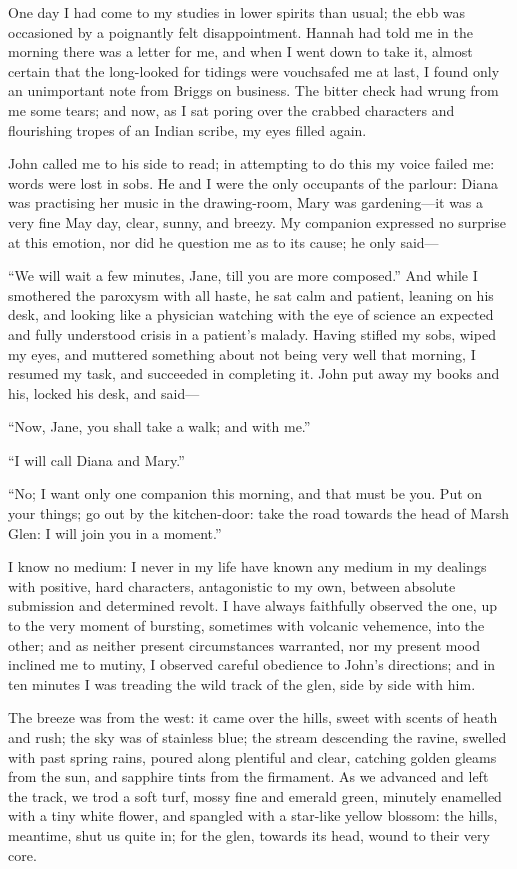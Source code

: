 One day I had come to my studies in lower spirits than usual; the ebb
was occasioned by a poignantly felt disappointment. Hannah had told me
in the morning there was a letter for me, and when I went down to take
it, almost certain that the long-looked for tidings were vouchsafed me
at last, I found only an unimportant note from \Mr{} Briggs on business. 
The bitter check had wrung from me some tears; and now, as I sat poring
over the crabbed characters and flourishing tropes of an Indian scribe,
my eyes filled again.

\St{} John called me to his side to read; in attempting to do this my
voice failed me: words were lost in sobs. He and I were the only
occupants of the parlour: Diana was practising her music in the
drawing-room, Mary was gardening---it was a very fine May day, clear,
sunny, and breezy. My companion expressed no surprise at this emotion,
nor did he question me as to its cause; he only said---

\enquote{We will wait a few minutes, Jane, till you are more composed.} 
And while I smothered the paroxysm with all haste, he sat calm and
patient, leaning on his desk, and looking like a physician watching with
the eye of science an expected and fully understood crisis in a
patient's malady. Having stifled my sobs, wiped my eyes, and muttered
something about not being very well that morning, I resumed my task, and
succeeded in completing it. \St{} John put away my books and his, locked
his desk, and said---

\enquote{Now, Jane, you shall take a walk; and with me.}

\enquote{I will call Diana and Mary.}

\enquote{No; I want only one companion this morning, and that must be
you. Put on your things; go out by the kitchen-door: take the road
towards the head of Marsh Glen: I will join you in a moment.}

I know no medium: I never in my life have known any medium in my
dealings with positive, hard characters, antagonistic to my own, between
absolute submission and determined revolt. I have always faithfully
observed the one, up to the very moment of bursting, sometimes with
volcanic vehemence, into the other; and as neither present circumstances
warranted, nor my present mood inclined me to mutiny, I observed careful
obedience to \St{} John's directions; and in ten minutes I was treading
the wild track of the glen, side by side with him.

The breeze was from the west: it came over the hills, sweet with scents
of heath and rush; the sky was of stainless blue; the stream descending
the ravine, swelled with past spring rains, poured along plentiful and
clear, catching golden gleams from the sun, and sapphire tints from the
firmament. As we advanced and left the track, we trod a soft turf,
mossy fine and emerald green, minutely enamelled with a tiny white
flower, and spangled with a star-like yellow blossom: the hills,
meantime, shut us quite in; for the glen, towards its head, wound to
their very core.

